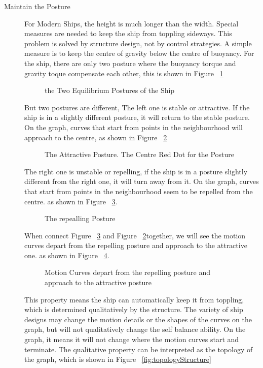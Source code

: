 \begin{description}
\item[Maintain the Posture]
For Modern Ships, the height is much longer than the width. 
Special measures are needed to keep the ship from toppling sideways. 
This problem is solved by structure design, not by control strategies.
A simple measure is to keep the centre of gravity below the centre of buoyancy.
For the ship, there are only two posture where the buoyancy torque and gravity toque compensate each other, 
this is shown in Figure ~\ref{fig:ship_equilibrium}

\begin{figure}

\caption{the Two Equilibrium Postures of the Ship}
\label{fig:ship_equilibrium}
\end{figure} 

But two postures are different, 
The left one is stable or attractive.
If the ship is in a slightly different posture, it will return to the stable posture.
On the graph,
curves that start from points in the neighbourhood will approach to the centre,
as shown in Figure ~\ref{fig:ship_stablePosition}
\begin{figure}

\caption{The Attractive Posture.
The Centre Red Dot for  the Posture}
\label{fig:ship_stablePosition}
\end{figure} 

The right one is unstable or repelling, 
if the ship is in a posture slightly different from the right one,
it will turn away from it.
On the graph,  curves that start from points in the neighbourhood seem to be repelled from the centre.
as shown in Figure ~\ref{fig:ship_unstablePosition}.
\begin{figure}

\caption{The repealling Posture}
\label{fig:ship_unstablePosition}
\end{figure} 

When connect Figure ~\ref{fig:ship_unstablePosition} and Figure ~\ref{fig:ship_stablePosition}together, 
we will see the motion curves depart from the repelling posture and approach to the attractive one.
as shown in Figure ~\ref{fig:global_flow}.
\begin{figure}

\caption{Motion Curves depart from the repelling posture and approach to the attractive posture}
\label{fig:global_flow}
\end{figure}
This property means the ship can automatically keep it from toppling, which is determined qualitatively by the structure.
The variety of ship designs may change the motion details or the shapes of the curves on the graph, 
but will not qualitatively change the self balance ability.
On the graph, it means it will not change where the motion curves start and terminate.
The qualitative property can be interpreted as the topology of the graph, which is shown in Figure ~\ref{fig:topologyStructure}


\end{description}
